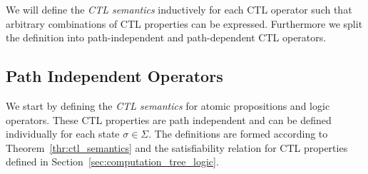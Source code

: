 \documentclass[11pt,a4paper,titlepage]{article}
\theoremstyle{definition}
\begin{document}
We will define the \textit{CTL semantics} inductively for each CTL operator such that arbitrary 
combinations of CTL properties can be expressed.
Furthermore we split the definition into path-independent and path-dependent CTL operators. 

\subsection{Path Independent Operators}

We start by defining the \textit{CTL semantics} for atomic propositions and logic operators. 
These CTL properties are path independent and can be defined individually for each state $\sigma \in \Sigma$.
The definitions are formed according to Theorem~\ref{thr:ctl_semantics} and the 
satisfiability relation for CTL properties defined in Section~\ref{sec:computation_tree_logic}.\\
\end{document}
